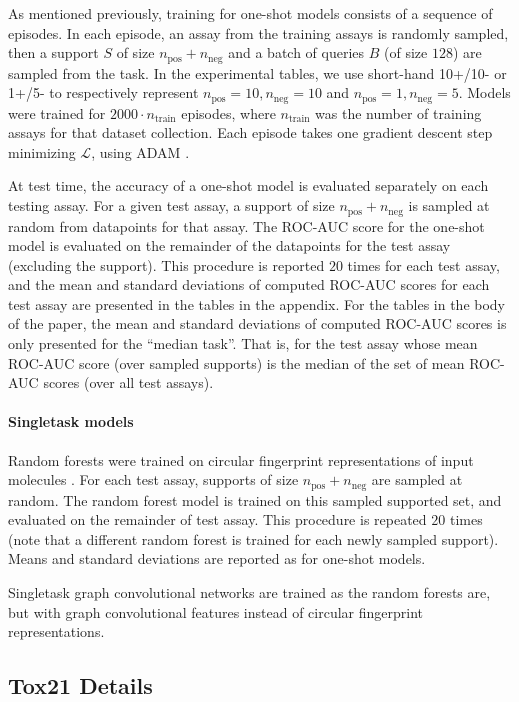 As mentioned previously, training for one-shot models consists of a sequence of episodes. In each episode, an assay from the training assays is randomly sampled, then a support $S$ of size $n_\textrm{pos} + n_\textrm{neg}$ and a batch of queries $B$ (of size $128$) are sampled from the task. In the experimental tables, we use short-hand 10+/10- or 1+/5- to respectively represent $n_\textrm{pos} = 10, n_\textrm{neg}=10$ and $n_\textrm{pos}=1,n_\textrm{neg}=5$. Models were trained for $2000\cdot n_\textrm{train}$ episodes, where $n_\textrm{train}$ was the number of training assays for that dataset collection. Each episode takes one gradient descent step minimizing $\mathcal{L}$, using ADAM \cite{kingma2014adam}.

At test time, the accuracy of a one-shot model is evaluated separately on each testing assay. For a given test assay, a support of size $n_\textrm{pos} + n_\textrm{neg}$ is sampled at random from datapoints for that assay. The ROC-AUC score for the one-shot model is evaluated on the remainder of the datapoints for the test assay (excluding the support). This procedure is reported $20$ times for each test assay, and the mean and standard deviations of computed ROC-AUC scores for each test assay are presented in the tables in the appendix. For the tables in the body of the paper, the mean and standard deviations of computed ROC-AUC scores is only presented for the ``median task''. That is, for the test assay whose mean ROC-AUC score (over sampled supports) is the median of the set of mean ROC-AUC scores (over all test assays).

\paragraph{Singletask models}
Random forests were trained on circular fingerprint representations of input molecules \cite{rogers2010extended}. For each test assay, supports of size $n_\textrm{pos} + n_\textrm{neg}$ are sampled at random. The random forest model is trained on this sampled supported set, and evaluated on the remainder of test assay. This procedure is repeated $20$ times (note that a different random forest is trained for each newly sampled support). Means and standard deviations are reported as for one-shot models.

Singletask graph convolutional networks are trained as the random forests are, but with graph convolutional features instead of circular fingerprint representations.

\subsection{Tox21 Details}

